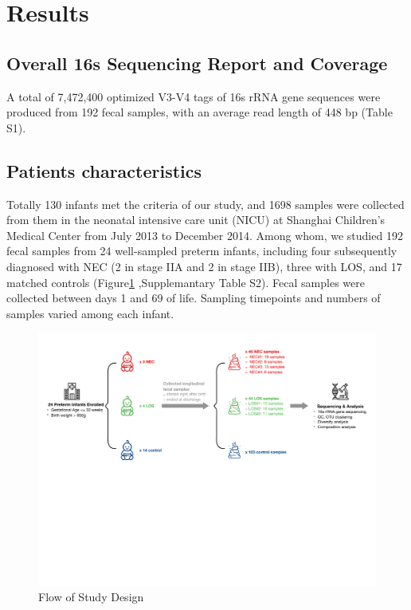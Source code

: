 \documentclass[fleqn,10pt,lineno]{wlpeerj} %
\begin{document}
\section*{Results}
  \subsection*{Overall 16s Sequencing Report and Coverage}
  A total of 7,472,400 optimized V3-V4 tags of 16s rRNA gene sequences were produced from 192 fecal samples, with an average read length of 448 bp (Table S1).

  \subsection*{Patients characteristics}
   Totally 130 infants met the criteria of our study, and 1698 samples were collected from them in the neonatal intensive care unit (NICU) at Shanghai Children’s Medical Center from July 2013 to December 2014.  Among whom, we studied 192 fecal samples from 24 well-sampled preterm infants, including four subsequently diagnosed with NEC (2 in stage IIA and 2 in stage IIB), three with LOS, and 17 matched controls (Figure\ref{fig:design} ,Supplemantary Table S2). Fecal samples were collected between days 1 and 69 of life. Sampling timepoints and numbers of samples varied among each infant.
     \begin{figure}[ht]\centering
       \includegraphics[width=\linewidth]{figure/design.pdf}
       \caption{Flow of Study Design}
       \label{fig:design}
     \end{figure}
\end{document}
